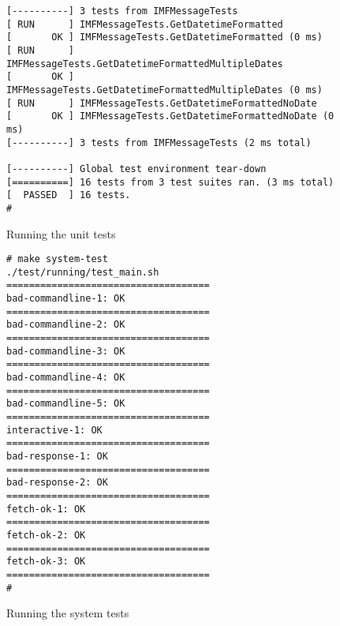 \documentclass[a4]{report}
\begin{document}
\begin{figure}[h!]
\begin{verbatim}
[----------] 3 tests from IMFMessageTests
[ RUN      ] IMFMessageTests.GetDatetimeFormatted
[       OK ] IMFMessageTests.GetDatetimeFormatted (0 ms)
[ RUN      ] IMFMessageTests.GetDatetimeFormattedMultipleDates
[       OK ] IMFMessageTests.GetDatetimeFormattedMultipleDates (0 ms)
[ RUN      ] IMFMessageTests.GetDatetimeFormattedNoDate
[       OK ] IMFMessageTests.GetDatetimeFormattedNoDate (0 ms)
[----------] 3 tests from IMFMessageTests (2 ms total)

[----------] Global test environment tear-down
[==========] 16 tests from 3 test suites ran. (3 ms total)
[  PASSED  ] 16 tests.
#
\end{verbatim}
\caption{Running the unit tests}
\end{figure}

\begin{figure}[h!]
\begin{verbatim}
# make system-test
./test/running/test_main.sh
====================================
bad-commandline-1: OK
====================================
bad-commandline-2: OK
====================================
bad-commandline-3: OK
====================================
bad-commandline-4: OK
====================================
bad-commandline-5: OK
====================================
interactive-1: OK
====================================
bad-response-1: OK
====================================
bad-response-2: OK
====================================
fetch-ok-1: OK
====================================
fetch-ok-2: OK
====================================
fetch-ok-3: OK
====================================
#
\end{verbatim}
\caption{Running the system tests}
\end{figure}


\printbibliography
\end{document}
